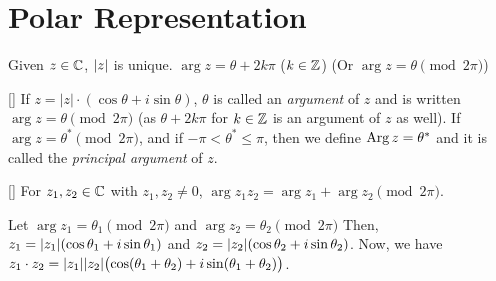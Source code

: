 \documentclass[../complex_variables_1.tex]{subfiles}
\begin{document}
\section{Polar Representation}

Given \(z \in \CC\), \(\lvert z\rvert\) is unique.
\(\arg z = \theta + 2k \pi\) (\(k \in \ZZ\))
(Or \(\arg z = \theta \pmod{2\pi}\))

\begin{Definition}{}[]
    If \(z = |z| \cdot (\cos\theta+i\sin\theta)\), \(\theta\) is called an \emph{argument} of \(z\)
    and is written \(\arg z = \theta \pmod{2\pi}\) (as \(\theta + 2k\pi\) for \(k \in \ZZ\)
    is an argument of \(z\) as well).
    If \(\arg z = \theta^\ast \pmod{2\pi}\), and if \(-\pi < \theta^\ast \le \pi\), then we define
    \(\operatorname{Arg} z = \theta^\ast\) and it is called the \emph{principal argument} of \(z\).
\end{Definition}

\begin{Theorem}{}[]
    For \(z_1, z_2 \in \CC\) with \(z_1, z_2 \neq 0\),
    \(\arg z_1z_2 = \arg z_1 + \arg z_2 \pmod{2\pi}\).
\end{Theorem}
\begin{myproof}[Proof]
    Let \(\arg z_1 = \theta_1 \pmod{2\pi}\) and \(\arg z_2 = \theta_2 \pmod{2\pi}\)
    Then, \(z_1 = \lvert z_1\rvert (\cos\theta_1 + i \sin\theta_1)\)
    and \(z_2 = \lvert z_2\rvert (\cos\theta_2 + i \sin\theta_2)\).
    Now, we have \(z_1 \cdot z_2 = \lvert z_1\rvert\lvert z_2\rvert \bigl( \cos(\theta_1+\theta_2)+i
    \sin(\theta_1+\theta_2) \bigr)\).
\end{myproof}
\end{document}
